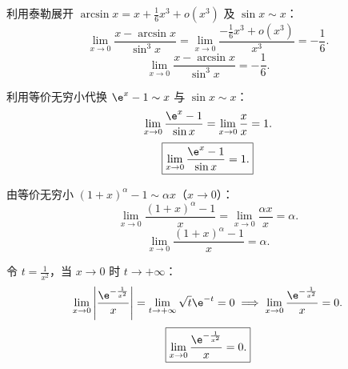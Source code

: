 \begin{solution}

    利用泰勒展开 $\arcsin x = x + \frac{1}{6}x^3 + o(x^3)$ 及 $\sin x \sim x$：
    \begin{equation}
        \lim_{x\to 0} \frac{x - \arcsin x}{\sin^3 x} = \lim_{x\to 0} \frac{-\frac{1}{6}x^3 + o(x^3)}{x^3} = -\frac{1}{6}.
    \end{equation}
    \begin{equation}
        \boxed{\lim_{x\to 0} \frac{x - \arcsin x}{\sin^3 x} = -\frac{1}{6}.}
    \end{equation}


    利用等价无穷小代换 $\e^x - 1 \sim x$ 与 $\sin x \sim x$：
    \begin{equation}
        \lim_{x\to 0} \frac{\e^x - 1}{\sin x} = \lim_{x\to 0} \frac{x}{x} = 1.
    \end{equation}
    \begin{equation}
        \boxed{\lim_{x\to 0} \frac{\e^x - 1}{\sin x} = 1.}
    \end{equation}


    由等价无穷小 $(1+x)^\alpha - 1 \sim \alpha x$（$x \to 0$）：
    \begin{equation}
        \lim_{x\to 0} \frac{(1+x)^\alpha - 1}{x} = \lim_{x\to 0} \frac{\alpha x}{x} = \alpha.
    \end{equation}
    \begin{equation}
        \boxed{\lim_{x\to 0} \frac{(1+x)^\alpha - 1}{x} = \alpha.}
    \end{equation}


    令 $t = \frac{1}{x^2}$，当 $x \to 0$ 时 $t \to +\infty$：
    \begin{equation}
        \lim_{x\to 0} \left| \frac{\e^{-\frac{1}{x^2}}}{x} \right| = \lim_{t\to +\infty} \sqrt{t}\e^{-t} = 0 \implies \lim_{x\to 0} \frac{\e^{-\frac{1}{x^2}}}{x} = 0.
    \end{equation}
    \begin{equation}
        \boxed{\lim_{x\to 0} \frac{\e^{-\frac{1}{x^2}}}{x} = 0.}
    \end{equation}



\end{solution}

